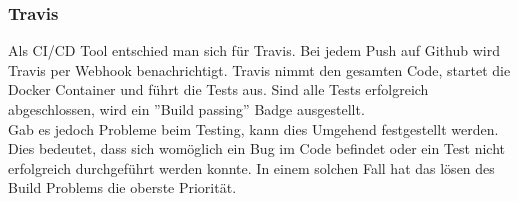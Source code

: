 \subsubsection*{Travis}
Als CI/CD Tool entschied man sich für Travis. Bei jedem Push auf Github wird Travis per Webhook benachrichtigt. Travis nimmt den gesamten Code, startet die Docker Container und führt die Tests aus. Sind alle Tests erfolgreich abgeschlossen, wird ein ''Build passing'' Badge ausgestellt. \\
Gab es jedoch Probleme beim Testing, kann dies Umgehend festgestellt werden. Dies bedeutet, dass sich womöglich ein Bug im Code befindet oder ein Test nicht erfolgreich durchgeführt werden konnte. In einem solchen Fall hat das lösen des Build Problems die oberste Priorität.


\newpage